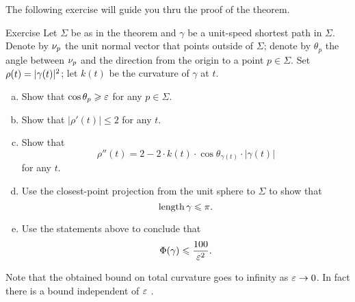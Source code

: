 The following exercise will guide you thru the proof of the theorem. 

\begin{thm}{Exercise}\label{ex:bound-tc}
Let $\Sigma$ be as in the theorem and $\gamma$ be a unit-speed shortest path in $\Sigma$.
Denote by $\nu_p$ the unit normal vector that points outside of $\Sigma$;
denote by $\theta_p$ the angle between $\nu_p$ and the direction from the origin to a point $p\in\Sigma$.
Set $\rho(t)\z=|\gamma(t)|^2$; let $k(t)$ be the curvature of $\gamma$ at $t$.
\begin{enumerate}[(a)]
\item Show that $\cos\theta_p\geqslant \varepsilon$ for any $p\in \Sigma$.
\item Show that $|\rho'(t)|\le 2$ for any $t$.
\item Show that 
\[\rho''(t)=2-2\cdot k(t)\cdot \cos \theta_{\gamma(t)}\cdot |\gamma(t)|\]
for any $t$.
\item Use the closest-point projection from the unit sphere to $\Sigma$ to show that 
\[\mathop{\rm length}\nolimits \gamma\leqslant \pi.\]
\item Use the statements above to conclude that 
\[\Phi({\gamma})\leqslant \frac{100}{\varepsilon^2}.\]
\end{enumerate}
\end{thm}

Note that the obtained bound on total curvature goes to infinity as $\varepsilon\to 0$.
In fact there is a bound independent of $\varepsilon$ \cite{lebedeva-petrunin}.
